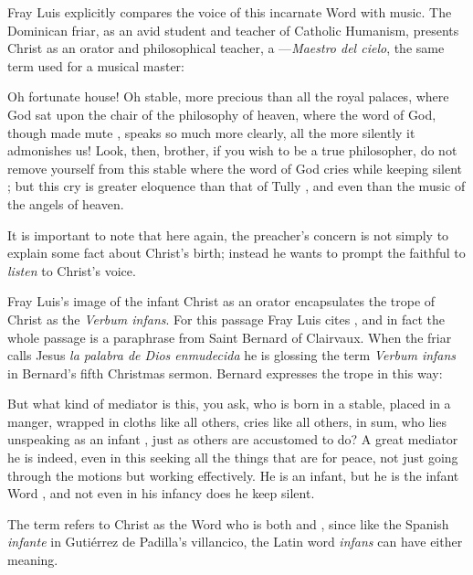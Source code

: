 Fray Luis explicitly compares the voice of this incarnate Word with music.
The Dominican friar, as an avid student and teacher of Catholic Humanism,
presents Christ as an orator and philosophical teacher, a ---\emph{Maestro del cielo}, the same term used for a musical master:
\begin{quoting}
    Oh fortunate house!
    Oh stable, more precious than all the royal palaces, where God sat upon the
    chair  of the philosophy of heaven, where the word of God,
    though made mute , speaks so much
    more clearly, all the more silently it admonishes us!
    Look, then, brother, if you wish to be a true philosopher, do not remove
    yourself from this stable where the word of God cries while keeping silent
    ;
    but this cry is greater eloquence than that of Tully , and even
    than the music of the angels of heaven.%
        \Autocite[39]{LuisdeGranada:Xmas}
\end{quoting}
It is important to note that here again, the preacher's concern is not simply to
explain some fact about Christ's birth; instead he wants to prompt the faithful
to \emph{listen} to Christ's voice.

Fray Luis's image of the infant Christ as an orator encapsulates the trope of
Christ as the \emph{Verbum infans}.
For this passage Fray Luis cites , and in fact the whole
passage is a paraphrase from Saint Bernard of Clairvaux.
When the friar calls Jesus \emph{la palabra de Dios enmudecida} he is glossing
the term \emph{Verbum infans} in Bernard's fifth Christmas sermon.
Bernard expresses the trope in this way:
\begin{quoting}
    But what kind of mediator is this, you ask, who is born in a stable, placed
    in a manger, wrapped in cloths like all others, cries like all others, in
    sum, who lies unspeaking as an infant , just as others
    are accustomed to do?
    A great mediator he is indeed, even in this seeking all the things that are
    for peace, not just going through the motions but working effectively.  He
    is an infant, but he is the infant Word , and not
    even in his infancy does he keep silent.%
        \Autocite[128A, Sermo V]{Bernard:Nativitate}
\end{quoting}
The term refers to Christ as the Word who is both  and
, since like the Spanish \emph{infante} in Gutiérrez de
Padilla's villancico, the Latin word \emph{infans} can have either meaning.

